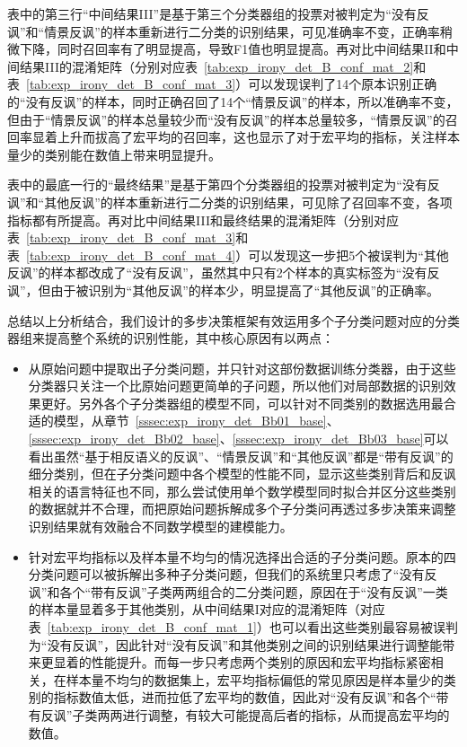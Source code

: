 表中的第三行“中间结果III”是基于第三个分类器组的投票对被判定为“没有反讽”和“情景反讽”的样本重新进行二分类的识别结果，可见准确率不变，正确率稍微下降，同时召回率有了明显提高，导致F1值也明显提高。再对比中间结果II和中间结果III的混淆矩阵（分别对应表~\ref{tab:exp_irony_det_B_conf_mat_2}和表~\ref{tab:exp_irony_det_B_conf_mat_3}）可以发现误判了14个原本识别正确的“没有反讽”的样本，同时正确召回了14个“情景反讽”的样本，所以准确率不变，但由于“情景反讽”的样本总量较少而“没有反讽”的样本总量较多，“情景反讽”的召回率显着上升而拔高了宏平均的召回率，这也显示了对于宏平均的指标，关注样本量少的类别能在数值上带来明显提升。

表中的最底一行的“最终结果”是基于第四个分类器组的投票对被判定为“没有反讽”和“其他反讽”的样本重新进行二分类的识别结果，可见除了召回率不变，各项指标都有所提高。再对比中间结果III和最终结果的混淆矩阵（分别对应表~\ref{tab:exp_irony_det_B_conf_mat_3}和表~\ref{tab:exp_irony_det_B_conf_mat_4}）可以发现这一步把5个被误判为“其他反讽”的样本都改成了“没有反讽”，虽然其中只有2个样本的真实标签为“没有反讽”，但由于被识别为“其他反讽”的样本少，明显提高了“其他反讽”的正确率。

总结以上分析结合，我们设计的多步决策框架有效运用多个子分类问题对应的分类器组来提高整个系统的识别性能，其中核心原因有以两点：

\begin{itemize}

\item 从原始问题中提取出子分类问题，并只针对这部份数据训练分类器，由于这些分类器只关注一个比原始问题更简单的子问题，所以他们对局部数据的识别效果更好。另外各个子分类器组的模型不同，可以针对不同类别的数据选用最合适的模型，从章节~\ref{sssec:exp_irony_det_Bb01_base}、\ref{sssec:exp_irony_det_Bb02_base}、\ref{sssec:exp_irony_det_Bb03_base}可以看出虽然“基于相反语义的反讽”、“情景反讽”和“其他反讽”都是“带有反讽”的细分类别，但在子分类问题中各个模型的性能不同，显示这些类别背后和反讽相关的语言特征也不同，那么尝试使用单个数学模型同时拟合并区分这些类别的数据就并不合理，而把原始问题拆解成多个子分类问再透过多步决策来调整识别结果就有效融合不同数学模型的建模能力。

\item 针对宏平均指标以及样本量不均匀的情况选择出合适的子分类问题。原本的四分类问题可以被拆解出多种子分类问题，但我们的系统里只考虑了“没有反讽”和各个“带有反讽”子类两两组合的二分类问题，原因在于“没有反讽”一类的样本量显着多于其他类别，从中间结果I对应的混淆矩阵（对应表~\ref{tab:exp_irony_det_B_conf_mat_1}）也可以看出这些类别最容易被误判为“没有反讽”，因此针对“没有反讽”和其他类别之间的识别结果进行调整能带来更显着的性能提升。而每一步只考虑两个类别的原因和宏平均指标紧密相关，在样本量不均匀的数据集上，宏平均指标偏低的常见原因是样本量少的类别的指标数值太低，进而拉低了宏平均的数值，因此对“没有反讽”和各个“带有反讽”子类两两进行调整，有较大可能提高后者的指标，从而提高宏平均的数值。

\end{itemize}

